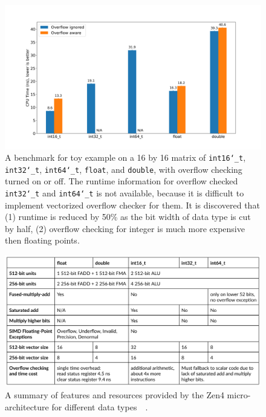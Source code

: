 \documentclass[logo,bsc,singlespacing,parskip]{infthesis}
\newcommand{\dtshort}{\texttt{int16\char`_t}}
\newcommand{\dtint}{\texttt{int32\char`_t}}
\newcommand{\dtlong}{\texttt{int64\char`_t}}
\newcommand{\dtfloat}{\texttt{float}}
\newcommand{\dtdouble}{\texttt{double}}
\begin{document}
\begin{figure}[H]\captionsetup{name=Figure}
    \begin{center}
        \includegraphics[width=\linewidth]{image/bench_datatype.png}
    \end{center}
    \caption{ A benchmark for toy example on a 16 by 16 matrix of \dtshort{},
\dtint{}, \dtlong{}, \dtfloat{}, and \dtdouble{}, with overflow checking turned
on or off. The runtime information for overflow checked \dtint{} and \dtlong{}
is not available, because it is difficult to implement vectorized overflow
checker for them. It is discovered that (1) runtime is
reduced by 50\% as the bit width of data type is cut by half, (2) overflow
checking for integer is much more expensive then floating points. }
    \label{bench_datatype}
\end{figure}


\begin{figure}[H]\captionsetup{name=Figure}
    \includegraphics[width=\linewidth]{image/arch-table.png}
    \caption{A summary of features and resources provided by the Zen4
    micro-architecture for different data
    types~\cite{Zen4Critique}~\cite{Zen2ChipWiki}.}
    \label{archtable}
\end{figure}
\end{document}
